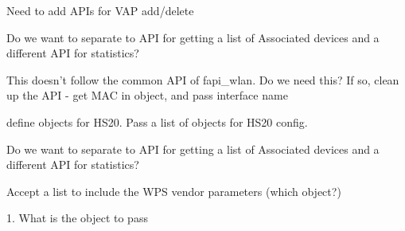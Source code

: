 
\begin{DoxyRefList}
\item[\label{todo__todo000001}%
\hypertarget{todo__todo000001}{}%
File \hyperlink{fapi__wlan_8h}{fapi\-\_\-wlan.h} ]Need to add A\-P\-Is for V\-A\-P add/delete  
\item[\label{todo__todo000003}%
\hypertarget{todo__todo000003}{}%
Member \hyperlink{group__FAPI__WLAN_ga3c9607a74d5a97b65b23bc6dd25957cc}{fapi\-\_\-wlan\-\_\-assoc\-\_\-devices\-\_\-query} (const char $\ast$ifname, \hyperlink{structObjList}{Obj\-List} $\ast$wl\-Obj, unsigned int flags)]Do we want to separate to A\-P\-I for getting a list of Associated devices and a different A\-P\-I for statistics? 
\item[\label{todo__todo000004}%
\hypertarget{todo__todo000004}{}%
Member \hyperlink{group__FAPI__WLAN_gacb2e814f3c8f28731b578dec9fb8424d}{fapi\-\_\-wlan\-\_\-assoc\-\_\-devices\-\_\-stats\-\_\-query} (const char $\ast$ifname, \hyperlink{structObjList}{Obj\-List} $\ast$wl\-Obj, unsigned int flags)]This doesn't follow the common A\-P\-I of fapi\-\_\-wlan. Do we need this? If so, clean up the A\-P\-I -\/ get M\-A\-C in object, and pass interface name  
\item[\label{todo__todo000009}%
\hypertarget{todo__todo000009}{}%
Member \hyperlink{group__FAPI__WLAN_gaaf73570c24d2fd4d244e8498bb91952b}{fapi\-\_\-wlan\-\_\-hotspot\-\_\-set} (const char $\ast$ifname, \hyperlink{structObjList}{Obj\-List} $\ast$wl\-Obj, unsigned int flags)]define objects for H\-S20. Pass a list of objects for H\-S20 config.  
\item[\label{todo__todo000011}%
\hypertarget{todo__todo000011}{}%
Member \hyperlink{group__FAPI__WLAN__MTK_ga4090a67332a33634f88ce8ee4c82196e}{fapi\-\_\-wlan\-\_\-mtk\-\_\-assoc\-\_\-devices\-\_\-query} (const char $\ast$iface, \hyperlink{structObjList}{Obj\-List} $\ast$wl\-Obj, unsigned int flags)]Do we want to separate to A\-P\-I for getting a list of Associated devices and a different A\-P\-I for statistics? 
\item[\label{todo__todo000010}%
\hypertarget{todo__todo000010}{}%
Member \hyperlink{group__FAPI__WLAN__MTK_ga4a9587395749e39648a991f1390a30a2}{fapi\-\_\-wlan\-\_\-mtk\-\_\-wps\-\_\-set} (const char $\ast$iface, \hyperlink{structObjList}{Obj\-List} $\ast$wl\-Obj, unsigned int flags)]Accept a list to include the W\-P\-S vendor parameters (which object?)  
\item[\label{todo__todo000008}%
\hypertarget{todo__todo000008}{}%
Member \hyperlink{group__FAPI__WLAN_gaf7b35fbc48c273637fafb13bbe2318fa}{fapi\-\_\-wlan\-\_\-wds\-\_\-set} (const char $\ast$ifname, \hyperlink{structObjList}{Obj\-List} $\ast$wl\-Obj, unsigned int flags)]1. What is the object to pass 


\end{DoxyRefList}
